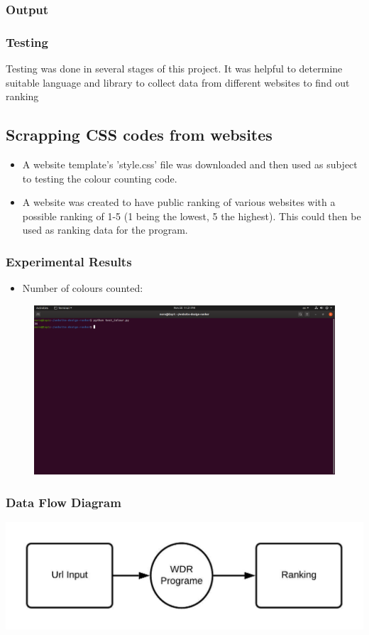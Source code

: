 \documentclass[11pt]{beamer}
\begin{document}
\begin{frame}
\frametitle{Output}
\end{frame}
\begin{frame}
\frametitle{Testing}
Testing was done in several stages of this project. It was helpful to determine suitable language and library to collect data from different websites to find out ranking\\
\subsection{Scrapping CSS codes from websites}
\begin{itemize}
	\item A website template's 'style.css' file was downloaded and then used as subject to testing the colour counting code.
	\item A website was created to have public ranking of various websites with a possible ranking of 1-5 (1 being the lowest, 5 the highest). This could then be used as ranking data for the program.
\end{itemize}
\end{frame}

\begin{frame}
\frametitle{Experimental Results}
\begin{itemize}
	\item Number of colours counted:
\end{itemize}
\begin{figure}[h]
	\includegraphics[scale=.3]{colourtest.png}
\end{figure}
\end{frame}
\begin{frame}
\frametitle{Data Flow Diagram}
\begin{flushleft}
	\centerline{\includegraphics[scale=1.2]{image/level_0_dfd.jpeg}}
\end{flushleft}
\end{frame}
\end{document}
